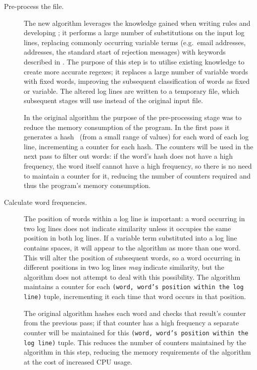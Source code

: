 \begin{description}

    \item [Pre-process the file.]  The new algorithm leverages the
        knowledge gained when writing rules and developing \parsername{};
        it performs a large number of substitutions on the input log lines,
        replacing commonly occurring variable terms (e.g.\ email addresses,
         addresses, the standard start of rejection messages)
        with keywords described in .  The
        purpose of this step is to utilise existing knowledge to create
        more accurate regexes; it replaces a large number of variable words
        with fixed words, improving the subsequent classification of words
        as fixed or variable.  The altered log lines are written to a
        temporary file, which subsequent stages will use instead of the
        original input file.

        In the original algorithm the purpose of the pre-processing stage
        was to reduce the memory consumption of the program.  In the first
        pass it generates a hash~\cite{hash-functions} (from a
        small range of values) for each word of each log line, incrementing
        a counter for each hash.  The counters will be used in the next
        pass to filter out words: if the word's hash does not have a high
        frequency, the word itself cannot have a high frequency, so there
        is no need to maintain a counter for it, reducing the number of
        counters required and thus the program's memory consumption.

    \item [Calculate word frequencies.]  The position of words within a log
        line is important: a word occurring in two log lines does not
        indicate similarity unless it occupies the same position in both
        log lines.  If a variable term substituted into a log line contains
        spaces, it will appear to the algorithm as more than one word.
        This will alter the position of subsequent words, so a word
        occurring in different positions in two log lines \textit{may\/}
        indicate similarity, but the algorithm does not attempt to deal
        with this possibility.  The algorithm maintains a counter for each
        \texttt{(word, word's position within the log line)} tuple,
        incrementing it each time that word occurs in that position.

        The original algorithm hashes each word and checks that result's
        counter from the previous pass; if that counter has a high
        frequency a separate counter will be maintained for this
        \texttt{(word, word's position within the log line)} tuple.  This
        reduces the number of counters maintained by the algorithm in this
        step, reducing the memory requirements of the algorithm at the cost
        of increased CPU usage.


\end{description}
